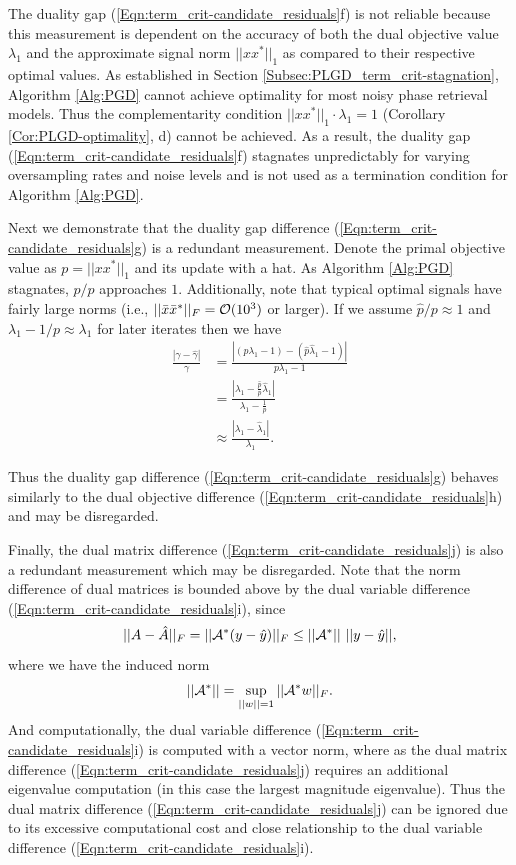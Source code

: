 \begin{enumerate}
The duality gap (\ref{Eqn:term_crit-candidate_residuals}f) is not reliable because this measurement is dependent on the accuracy of both the dual objective value $\lambda_1$ and the approximate signal norm $||xx^*||_1$ as compared to their respective optimal values.  As established in Section \ref{Subsec:PLGD_term_crit-stagnation}, Algorithm \ref{Alg:PGD} cannot achieve optimality for most noisy phase retrieval models.  Thus the complementarity condition $||xx^*||_1 \cdot \lambda_1 = 1$ (Corollary \ref{Cor:PLGD-optimality}, d) cannot be achieved.  As a result, the duality gap (\ref{Eqn:term_crit-candidate_residuals}f) stagnates unpredictably for varying oversampling rates and noise levels and is not used as a termination condition for Algorithm \ref{Alg:PGD}.



Next we demonstrate that the duality gap difference (\ref{Eqn:term_crit-candidate_residuals}g) is a redundant measurement.  Denote the primal objective value as $p = ||xx^*||_1$ and its update with a hat.  As Algorithm \ref{Alg:PGD} stagnates, $\hat{p} / p$ approaches $1$. Additionally, note that typical optimal signals have fairly large norms (i.e., $||\bar{x}\bar{x}^*||_F = {\mathcal O}(10^3)$ or larger).  If we assume $\hat{p}/p \approx 1$ and $\lambda_1 -  1/p \approx \lambda_1$ for later iterates then we have
\begin{equation}
\begin{split}
\frac{| \gamma - \hat{\gamma}|}{\gamma}	&	=	\frac{| (p \lambda_1 - 1) - (\hat{p}\hat{\lambda}_1 - 1) |}{p \lambda_1 - 1}
		\\
	&	= \frac{\left| \lambda_1 - \frac{\hat{p}}{p}\hat{\lambda}_1 \right|}{ \lambda_1 - \frac{1}{p} }
		\\
	&	\approx \frac{| \lambda_1 - \hat{\lambda}_1|}{\lambda_1}.
\end{split}
\end{equation}

Thus the duality gap difference (\ref{Eqn:term_crit-candidate_residuals}g) behaves similarly to the dual objective difference (\ref{Eqn:term_crit-candidate_residuals}h) and may be disregarded.  

Finally, the dual matrix difference (\ref{Eqn:term_crit-candidate_residuals}j) is also a redundant measurement which may be disregarded.  Note that the norm difference of dual matrices is bounded above by the dual variable difference (\ref{Eqn:term_crit-candidate_residuals}i), since
\[
||A - \hat{A}||_F = ||{\mathcal A}^*(y - \hat{y})||_F \leq ||{\mathcal A}^*|| \ ||y - \hat{y}||,
\]
where we have the induced norm
\[
||{\mathcal A}^*|| = \sup_{\substack{||w||=1}}||{\mathcal A}^*w||_F.
\]
And computationally, the dual variable difference (\ref{Eqn:term_crit-candidate_residuals}i) is computed with a vector norm, where as the dual matrix difference (\ref{Eqn:term_crit-candidate_residuals}j) requires an additional eigenvalue computation (in this case the largest magnitude eigenvalue).  Thus the dual matrix difference (\ref{Eqn:term_crit-candidate_residuals}j) can be ignored due to its excessive computational cost and close relationship to the dual variable difference (\ref{Eqn:term_crit-candidate_residuals}i).




\end{enumerate}
